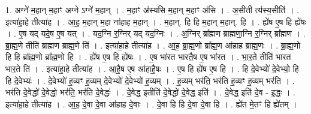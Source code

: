 \documentclass[17pt]{extarticle}
\begin{document}
1. अग्ने॑ म॒हान् म॒हाꣳ अग्ने ऽग्ने॑ म॒हान् । . म॒हाꣳ अ॑स्यसि म॒हान् म॒हाꣳ अ॑सि । . अ॒सीती त्य॑स्य॒सीति॑ । . इत्या॑हा॒हे तीत्या॑ह । . आ॒ह॒ म॒हान् म॒हा ना॑हाह म॒हान् । . म॒हान्. हि हि म॒हान् म॒हान्. हि । . ह्ये॑ष ए॒ष हि ह्ये॑षः । . ए॒ष यद् यदे॒ष ए॒ष यत् । . यद॒ग्नि र॒ग्निर् यद् यद॒ग्निः । . अ॒ग्निर् ब्रा᳚ह्मण ब्राह्मणा॒ग्नि र॒ग्निर् ब्रा᳚ह्मण । . ब्रा॒ह्म॒णे तीति॑ ब्राह्मण ब्राह्म॒णे ति॑ । . इत्या॑हा॒हे तीत्या॑ह । . आ॒ह॒ ब्रा॒ह्म॒णो ब्रा᳚ह्म॒ण आ॑हाह ब्राह्म॒णः । . ब्रा॒ह्म॒णो हि हि ब्रा᳚ह्म॒णो ब्रा᳚ह्म॒णो हि । . ह्ये॑ष ए॒ष हि ह्ये॑षः । . ए॒ष भा॑रत भारतै॒ष ए॒ष भा॑रत । . भा॒र॒ते तीति॑ भारत भार॒ते ति॑ । . इत्या॑हा॒हे तीत्या॑ह । . आ॒है॒ष ए॒ष आ॑हाहै॒षः । . ए॒ष हि ह्ये॑ष ए॒ष हि । . हि दे॒वेभ्यो॑ दे॒वेभ्यो॒ हि हि दे॒वेभ्यः॑ । . दे॒वेभ्यो॑ ह॒व्यꣳ ह॒व्यम् दे॒वेभ्यो॑ दे॒वेभ्यो॑ ह॒व्यम् । . ह॒व्यम् भर॑ति॒ भर॑ति ह॒व्यꣳ ह॒व्यम् भर॑ति । . भर॑ति दे॒वेद्धो॑ दे॒वेद्धो॒ भर॑ति॒ भर॑ति दे॒वेद्धः॑ । . दे॒वेद्ध॒ इतीति॑ दे॒वेद्धो॑ दे॒वेद्ध॒ इति॑ । . दे॒वेद्ध॒ इति॑ दे॒व - इ॒द्धः॒ । . इत्या॑हा॒हे तीत्या॑ह । . आ॒ह॒ दे॒वा दे॒वा आ॑हाह दे॒वाः । . दे॒वा हि हि दे॒वा दे॒वा हि । . ह्ये॑त मे॒तꣳ हि ह्ये॑तम् । \newline
\end{document}
